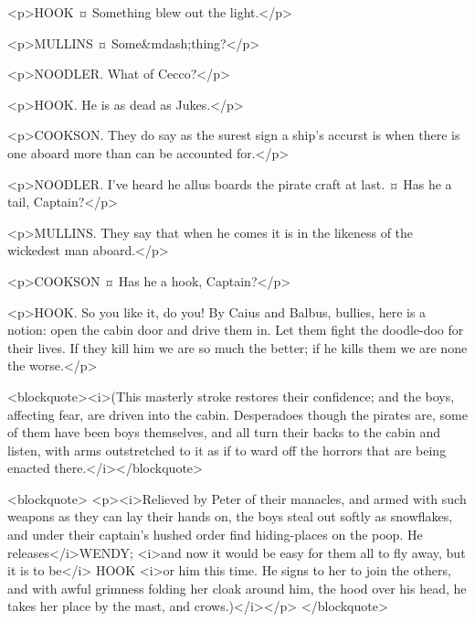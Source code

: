 <p>HOOK ¤
Something blew out the light.</p>

<p>MULLINS ¤
Some&mdash;thing?</p>

<p>NOODLER. What of Cecco?</p>

<p>HOOK. He is as dead as Jukes.</p>


<p>COOKSON. They do say as the surest sign a ship's accurst is when there is one aboard more than can be accounted for.</p>

<p>NOODLER. I've heard he allus boards the pirate craft at last.
¤
Has he a tail, Captain?</p>

<p>MULLINS. They say that when he comes it is in the likeness of the wickedest man aboard.</p>

<p>COOKSON ¤
Has he a hook, Captain?</p>


<p>HOOK. So you like it, do you! By Caius and Balbus, bullies, here is a notion: open the cabin door and drive them in. Let them fight the doodle-doo for their lives. If they kill him we are so much the better; if he kills them we are none the worse.</p>

<blockquote><i>(This masterly stroke restores their confidence; and the boys, affecting fear, are driven into the cabin. Desperadoes though the pirates are, some of them have been boys themselves, and all turn their backs to the cabin and listen, with arms outstretched to it as if to ward off the horrors that are being enacted there.</i></blockquote>

<blockquote> <p><i>Relieved by Peter of their manacles, and armed with such weapons as they can lay their hands on, the boys steal out softly as snowflakes, and under their captain's hushed order find hiding-places on the poop. He releases</i>WENDY; <i>and now it would be easy for them all to fly away, but it is to be</i> HOOK <i>or him this time. He signs to her to join the others, and with awful grimness folding her cloak around him, the hood over his head, he takes her place by the mast, and crows.)</i></p> </blockquote>

